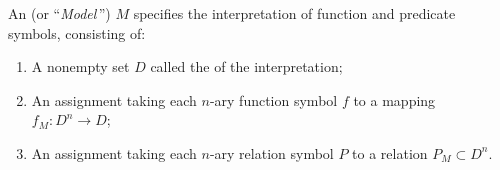 \begin{definition}\label{fol-0006}%
An  (or ``\textit{Model}\,'') $M$ specifies the
interpretation of function and predicate symbols, consisting of:
\begin{enumerate}
\item A nonempty set $D$ called the  of the interpretation;
\item An assignment taking each $n$-ary function symbol $f$ to a mapping
  $f_{M}\colon D^{n}\to D$;
\item An assignment taking each $n$-ary relation symbol $P$ to a
  relation $P_{M}\subset D^{n}$.
\end{enumerate}
\end{definition}
